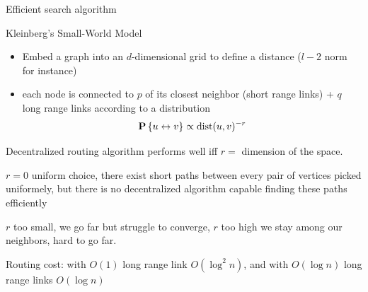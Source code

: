 Efficient search algorithm

Kleinberg’s Small-World Model
\begin{itemize}
  \item Embed a graph into an $d$-dimensional grid to define a distance ($l-2$ norm for instance)
  \item each node is connected to $p$ of its closest neighbor (short range links) + $q$ long range links according to a distribution
  \[
    \P{u \leftrightarrow v} \propto \text{dist}(u,v)^{-r}
  \]
\end{itemize}

Decentralized routing algorithm performs well iff $r=$ dimension of the space.

$r=0$ uniform choice, there exist short paths between every pair of vertices picked uniformely, but there is no decentralized algorithm capable finding these paths efficiently

$r$ too small, we go far but struggle to converge, $r$ too high we stay among our neighbors, hard to go far.

Routing cost: with $O(1)$ long range link $O(\log^2 n)$, and with $O(\log n)$ long range links $O(\log n)$
